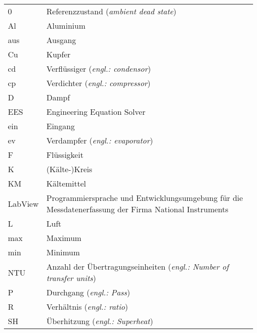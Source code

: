 \begin{onehalfspacing}
\begin{longtable}[h]{p{} p{}}
		0 & Referenzzustand (\emph{ambient dead state})\\
		Al & Aluminium\\ 
		aus & Ausgang\\		
		Cu & Kupfer \\
		cd & Verflüssiger (\emph{engl.: condensor})\\
		cp & Verdichter (\emph{engl.: compressor})\\
		D & Dampf \\     
		EES & Engineering Equation Solver \\
		ein & Eingang \\
		ev & Verdampfer (\emph{engl.: evaporator})\\
		F & Flüssigkeit\\	
		K & (Kälte-)Kreis\\
		KM & Kältemittel\\
		LabView & Programmiersprache und Entwicklungsumgebung für die Messdatenerfassung der Firma National Instruments\\
		L & Luft\\
		max & Maximum \\
		min & Minimum \\
		NTU & Anzahl der Übertragungseinheiten (\emph{engl.: Number of transfer units}) \\
		P & Durchgang (\emph{engl.: Pass})\\
		R & Verhältnis (\emph{engl.: ratio})\\
		SH & Überhitzung (\emph{engl.: Superheat})\\

		
\end{longtable}
\end{onehalfspacing}
